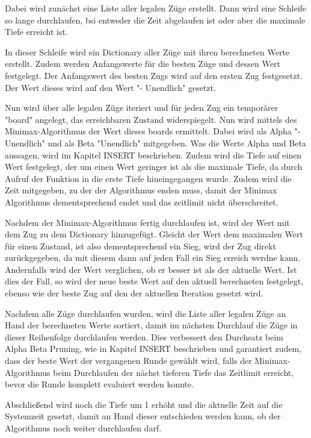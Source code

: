     Dabei wird zunächst eine Liste aller legalen Züge erstellt. Dann wird
eine Schleife so lange durchlaufen, bsi entweder die Zeit abgelaufen ist
oder aber die maximale Tiefe erreicht ist.

In dieser Schleife wird ein Dictionary aller Züge mit ihren berechneten
Werte erstellt. Zudem werden Anfangswerte für die besten Züge und dessen
Wert festgelegt. Der Anfangswert des besten Zugs wird auf den ersten Zug
festgesetzt. Der Wert dieses wird auf den Wert "- Unendlich" gesetzt.

Nun wird über alle legalen Züge iteriert und für jeden Zug ein
temporärer "board" angelegt, das erreichbaren Zustand widerspiegelt. Nun
wird mittels des Minimax-Algorithmus der Wert dieses boards ermittelt.
Dabei wird als Alpha "- Unendlich" und als Beta "Unendlich" mitgegeben.
Was die Werte Alpha und Beta aussagen, wird im Kapitel INSERT
beschrieben. Zudem wird die Tiefe auf einen Wert festgelegt, der um
einen Wert geringer ist als die maximale Tiefe, da durch Aufruf der
Funktion in die erste Tiefe hineingegangen wurde. Zudem wird die Zeit
mitgegeben, zu der der Algorithmus enden muss, damit der Minimax
Algorithmus dementsprechend endet und das zeitlimit nicht überschreitet.

Nachdem der Minimax-Algorithmus fertig durchlaufen ist, wird der Wert
mit dem Zug zu dem Dictionary hinzugefügt. Gleicht der Wert dem
maximalen Wert für einen Zustand, ist also dementsprechend ein Sieg,
wird der Zug direkt zurückgegeben, da mit diesem dann auf jeden Fall ein
Sieg erreich werdne kann. Andernfalls wird der Wert verglichen, ob er
besser ist als der aktuelle Wert. Ist dies der Fall, so wird der neue
beste Wert auf den aktuell berechneten festgelegt, ebenso wie der beste
Zug auf den der aktuellen Iteration gesetzt wird.

Nachdem alle Züge durchlaufen wurden, wird die Liste aller legalen Züge
an Hand der berechneten Werte sortiert, damit im nächsten Durchlauf die
Züge in dieser Reihenfolge durchlaufen werden. Dies verbessert den
Durchsatz beim Alpha Beta Pruning, wie in Kapitel INSERT beschrieben und
garantiert zudem, dass der beste Wert der vergangenen Runde gewählt
wird, falls der Minimax-Algorithmus beim Durchlaufen der nächst tieferen
Tiefe das Zeitlimit erreicht, bevor die Runde komplett evaluiert werden
konnte.

Abschließend wird noch die Tiefe um 1 erhöht und die aktuelle Zeit auf
die Systemzeit gesetzt, damit an Hand dieser entschieden werden kann, ob
der Algorithmus noch weiter durchlaufen darf.

